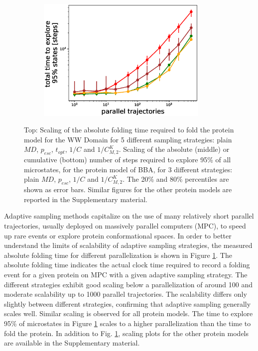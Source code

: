 \begin{figure}[H]
\begin{subfigure}[t]{0.5\textwidth}
    \includegraphics[width=0.9\textwidth]{figures/1FME_6_steps10000_scaling_explore_total.eps}
  \end{subfigure}
  \caption{Top: Scaling of the absolute folding time required to fold the
  protein model for the WW Domain for 5 different sampling strategies: plain
  $MD$, $p_{esc}$, $t_{opt}$, $1/C$ and $1/C_{M,2}^K$. Scaling of the
  absolute (middle) or cumulative (bottom) number of steps required to explore
  95\% of all microstates, for the protein  model of BBA, for 3 different
  strategies: plain $MD$, $p_{esc}$, $1/C$ and $1/C_{M,2}^K$.  
  The 20\% and 80\% percentiles are shown as error bars. 
  Similar figures for the other
  protein models are reported in the Supplementary material.}
  \label{fig:scaling}
\end{figure}

Adaptive sampling methods capitalize on the use of many relatively short
parallel trajectories, usually deployed on massively parallel computers (MPC),
to speed up rare events or explore protein conformational spaces. In order to
better understand the limits of scalability of adaptive sampling strategies,
the measured absolute folding time for different parallelization is shown in
Figure \ref{fig:scaling}. The absolute folding time indicates the actual clock
time required to record a folding event for a given protein on MPC with a given
adaptive sampling strategy. The different strategies exhibit good scaling below
a parallelization of around 100 and moderate scalability up to 1000 parallel
trajectories. The scalability differs only slightly between different
strategies, confirming that adaptive sampling generally scales well.
Similar scaling is observed for all protein models. The time to explore 95\% of
microstates in Figure \ref{fig:scaling} scales to a higher parallelization than
the time to fold the protein. In addition to Fig.
\ref{fig:scaling}, scaling plots for the other protein models are
available in the Supplementary material. 

